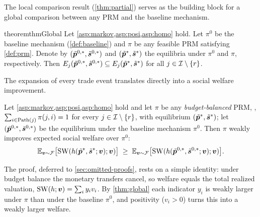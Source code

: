 The local comparison result (\cref{thm:partial}) serves as the building block for a global comparison between any PRM and the baseline mechanism.

\begin{restatable}{theorem}{thmGlobal}
\label{thm:global}
Let \cref{asp:markov,asp:posi,asp:homo} hold.
Let $\pi^0$ be the baseline mechanism (\cref{def:baseline}) and $\pi$ be any feasible PRM satisfying \cref{def:prm}. Denote by $(\tilde{{\bm{p}}}^{0,*}, \tilde{{\bm{s}}}^{0,*})$ and $(\tilde{{\bm{p}}}^*, \tilde{{\bm{s}}}^*)$ the equilibria under $\pi^0$ and $\pi$, respectively. Then $E_j(\tilde{{\bm{p}}}^{0,*}, \tilde{{\bm{s}}}^{0,*}) \subseteq E_j(\tilde{{\bm{p}}}^*, \tilde{{\bm{s}}}^*)$ for all $j \in \mathcal{I} \setminus \{r\}$.
\end{restatable}



The expansion of every trade event translates directly into a social welfare improvement.

\begin{corollary}
\label{cor:welfare}
Let \cref{asp:markov,asp:posi,asp:homo} hold and let $\pi$ be any \emph{budget-balanced} PRM, \ie, $\sum_{i \in \operatorname{Path}(j)} \pi(j,i) = 1$ for every $j \in \mathcal{I} \setminus \{r\}$, with equilibrium $(\tilde{{\bm{p}}}^*, \tilde{{\bm{s}}}^*)$; let $(\tilde{{\bm{p}}}^{0,*}, \tilde{{\bm{s}}}^{0,*})$ be the equilibrium under the baseline mechanism $\pi^0$. Then $\pi$ weakly improves expected social welfare over $\pi^0$:
\[
\mathbb{E}_{{\bm{v}} \sim \mathcal{F}}\big[\mathrm{SW}(h(\tilde{{\bm{p}}}^*, \tilde{{\bm{s}}}^*; {\bm{v}}); {\bm{v}})\big] \;\ge\; \mathbb{E}_{{\bm{v}} \sim \mathcal{F}}\big[\mathrm{SW}(h(\tilde{{\bm{p}}}^{0,*}, \tilde{{\bm{s}}}^{0,*}; {\bm{v}}); {\bm{v}})\big].
\]
\end{corollary}

The proof, deferred to \cref{sec:omitted-proofs}, rests on a simple identity: under budget balance the monetary transfers cancel, so welfare equals the total realized valuation, $\mathrm{SW}(h;{\bm{v}}) = \sum_{i} y_i v_i$. By \cref{thm:global} each indicator $y_i$ is weakly larger under $\pi$ than under the baseline $\pi^0$, and positivity ($v_i > 0$) turns this into a weakly larger welfare.
